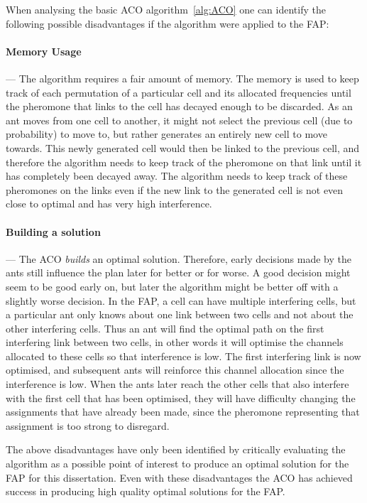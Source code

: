 When analysing the basic ACO algorithm~\ref{alg:ACO} one can identify the following possible disadvantages if the algorithm were applied to the FAP:
\paragraph{Memory Usage}
--- The algorithm requires a fair amount of memory. The memory is used to keep track of each permutation of a particular cell and its allocated frequencies until the pheromone that links to the cell has decayed enough to be discarded. As an ant moves from one cell to another, it might not select the previous cell (due to probability) to move to, but rather generates an entirely new cell to move towards. This newly generated cell would then be linked to the previous cell, and therefore the algorithm needs to keep track of the pheromone on that link until it has completely been decayed away. The algorithm needs to keep track of these pheromones on the links even if the new link to the generated cell is not even close to optimal and has very high interference.
\paragraph{Building a solution}
--- The ACO \emph{builds} an optimal solution. Therefore, early decisions made by the ants still influence the plan later for better or for worse. A good decision might seem to be good early on, but later the algorithm might be better off with a slightly worse decision. In the FAP, a cell can have multiple interfering cells, but a particular ant only knows about one link between two cells and not about the other interfering cells. Thus an ant will find the optimal path on the first interfering link between two cells, in other words it will optimise the channels allocated to these cells so that interference is low. The first interfering link is now optimised, and subsequent ants will reinforce this channel allocation since the interference is low. When the ants later reach the other cells that also interfere with the first cell that has been optimised, they will have difficulty changing the assignments that have already been made, since the pheromone representing that assignment is too strong to disregard.

The above disadvantages have only been identified by critically evaluating the algorithm as a possible point of interest to produce an optimal solution for the FAP for this dissertation. Even with these disadvantages the ACO has achieved success in producing high quality optimal solutions for the FAP.

